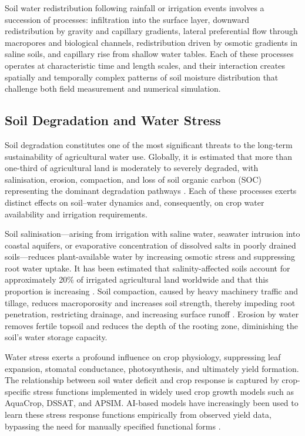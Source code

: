 \documentclass[land,article,submit,pdftex,moreauthors]{Definitions/mdpi}
\numberwithin{equation}{section}
\begin{document}
Soil water redistribution following rainfall or irrigation events involves a succession of processes: infiltration into the surface layer, downward redistribution by gravity and capillary gradients, lateral preferential flow through macropores and biological channels, redistribution driven by osmotic gradients in saline soils, and capillary rise from shallow water tables. Each of these processes operates at characteristic time and length scales, and their interaction creates spatially and temporally complex patterns of soil moisture distribution that challenge both field measurement and numerical simulation.

\subsection{Soil Degradation and Water Stress}

Soil degradation constitutes one of the most significant threats to the long-term sustainability of agricultural water use. Globally, it is estimated that more than one-third of agricultural land is moderately to severely degraded, with salinisation, erosion, compaction, and loss of soil organic carbon (SOC) representing the dominant degradation pathways \citep{glassensio2022global}. Each of these processes exerts distinct effects on soil--water dynamics and, consequently, on crop water availability and irrigation requirements.

Soil salinisation---arising from irrigation with saline water, seawater intrusion into coastal aquifers, or evaporative concentration of dissolved salts in poorly drained soils---reduces plant-available water by increasing osmotic stress and suppressing root water uptake. It has been estimated that salinity-affected soils account for approximately 20\% of irrigated agricultural land worldwide and that this proportion is increasing \citep{nachshon2018cropland}. Soil compaction, caused by heavy machinery traffic and tillage, reduces macroporosity and increases soil strength, thereby impeding root penetration, restricting drainage, and increasing surface runoff \citep{Lemenkova202222}. Erosion by water removes fertile topsoil and reduces the depth of the rooting zone, diminishing the soil's water storage capacity.

Water stress exerts a profound influence on crop physiology, suppressing leaf expansion, stomatal conductance, photosynthesis, and ultimately yield formation. The relationship between soil water deficit and crop response is captured by crop-specific stress functions implemented in widely used crop growth models such as AquaCrop, DSSAT, and APSIM. AI-based models have increasingly been used to learn these stress response functions empirically from observed yield data, bypassing the need for manually specified functional forms \citep{van2019machine}.
\end{document}

